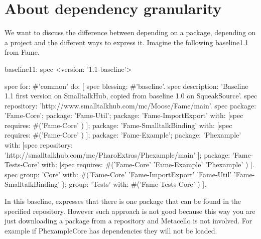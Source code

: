 \documentclass[a4paper,10pt,twoside]{book}
\begin{document}
\section{About dependency granularity}
We want to discuss the difference between depending on a package, depending on a project and the different ways to express it.
Imagine the following baseline1.1 from Fame.

\begin{code}{}
baseline11: spec
	<version: '1.1-baseline'>

	spec for: #'common' do: [
		spec blessing: #'baseline'.
		spec description: 'Baseline 1.1 first version on SmalltalkHub, copied from baseline 1.0 on SqueakSource'.
		spec repository: 'http://www.smalltalkhub.com/mc/Moose/Fame/main'.
		spec
			package: 'Fame-Core';
			package: 'Fame-Util';
			package: 'Fame-ImportExport' with: [spec requires: #('Fame-Core' ) ];
			package: 'Fame-SmalltalkBinding' with: [spec requires: #('Fame-Core' ) ];
			package: 'Fame-Example';
			package: 'Phexample' with: [spec repository: 'http://smalltalkhub.com/mc/PharoExtras/Phexample/main' ];
			package: 'Fame-Tests-Core' with: [spec requires: #('Fame-Core' 'Fame-Example' 'Phexample' ) ].
		spec
			group: 'Core' with: #('Fame-Core' 'Fame-ImportExport' 'Fame-Util' 'Fame-SmalltalkBinding' );
			group: 'Tests' with: #('Fame-Tests-Core' ) ].
\end{code}

In this baseline, 
expresses that there is one package that can be found in the specified repository.
However such approach is not good because this way you are just downloading a package from a repository and Metacello is not involved. For example if PhexampleCore has dependencies they will not be loaded.
\end{document}
